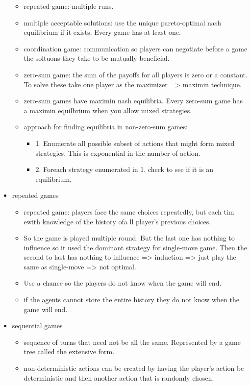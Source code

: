 \begin{itemize}[noitemsep,nolistsep]
\begin{itemize}[noitemsep,nolistsep]
		\item repeated game: multiple runs.
		\item multiple acceptable solutions: use the unique pareto-optimal nash equilibrium if it exists. Every game has at least one.
		\item coordination game: communication so players can negotiate before a game the soltuons they take to be mutually beneficial.
		\item zero-sum game: the sum of the payoffs for all players is zero or a constant. To solve these take one player as the maximizer => maximin technique.
		\item zero-sum games have maximin nash equilibria. Every zero-sum game has a maximin equilbrium when you allow mixed strategies.
		\item approach for finding equilibria in non-zero-sum games:
		\begin{itemize}[noitemsep,nolistsep]
			\item 1. Enumerate all possible subset of actions that might form mixed strategies. This is exponential in the number of action.
			\item 2. Foreach strategy enumerated in 1. check to see if it is an equilibrium.
		\end{itemize}
	\end{itemize}
	\item repeated games
	\begin{itemize}[noitemsep,nolistsep]
		\item repeated game: players face the same choices repeatedly, but each tim ewith knowledge of the history ofa ll player's previous choices.
		\item So the game is played multiple round. But the last one has nothing to influence so it used the dominant strategy for single-move game. Then the second to last has nothing to influence => induction => just play the same as single-move => not optimal.
		\item Use a chance so the players do not know when the game will end.
		\item if the agents cannot store the entire history they do not know when the game will end.
	\end{itemize}
	\item sequential games
	\begin{itemize}[noitemsep,nolistsep]
		\item sequence of turns that need not be all the same. Represented by a game tree called the extensive form.
		\item non-deterministic actions can be created by having the player's action be deterministic and then another action that is randomly chosen.

\end{itemize}
\end{itemize}
